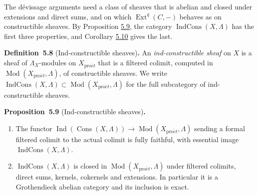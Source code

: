 \documentclass[11pt]{article}
\newenvironment{bpstatement}[2]{\par\addvspace{0.6\baselineskip}\noindent\textbf{#1}#2\textbf{.}\enspace\ignorespaces}
  {\par\addvspace{0.4\baselineskip}}
\newenvironment{bpstatementit}[2]{\begin{bpstatement}{#1}{#2}\itshape\ignorespaces}{\end{bpstatement}}
\providecommand{\Cons}{}\renewcommand{\Cons}{\operatorname{Cons}}
\providecommand{\Ext}{}\renewcommand{\Ext}{\operatorname{Ext}}
\providecommand{\IndCons}{}\renewcommand{\IndCons}{\operatorname{IndCons}}
\begin{document}
The dévissage arguments need a class of sheaves that is abelian and closed under extensions and direct sums, and on which \(\Ext^q(C,-)\) behaves as on constructible sheaves. By Proposition \hyperref[bp433]{5.9}, the category \(\IndCons(X,\Lambda)\) has the first three properties, and Corollary \hyperref[bp436]{5.10} gives the last.

\label{bp432}%
\begin{bpstatement}{Definition~5.8}{ (Ind-constructible sheaves)}
An \emph{ind-constructible sheaf} on \(X\) is a sheaf of \(\Lambda_X\)-modules on \(X_{\mathrm{pro}\acute{e}t}\) that is a filtered colimit, computed in \(\operatorname{Mod}(X_{\mathrm{pro}\acute{e}t},\Lambda)\), of constructible sheaves. We write \(\IndCons(X,\Lambda)\subset\operatorname{Mod}(X_{\mathrm{pro}\acute{e}t},\Lambda)\) for the full subcategory of ind-constructible sheaves.
\end{bpstatement}

\label{bp433}%
\begin{bpstatementit}{Proposition~5.9}{ (Ind-constructible sheaves)}
\begin{enumerate}
\item The functor \(\operatorname{Ind}(\Cons(X,\Lambda))\to\operatorname{Mod}(X_{\mathrm{pro}\acute{e}t},\Lambda)\) sending a formal filtered colimit to the actual colimit is fully faithful, with essential image \(\IndCons(X,\Lambda)\).
\item \(\IndCons(X,\Lambda)\) is closed in \(\operatorname{Mod}(X_{\mathrm{pro}\acute{e}t},\Lambda)\) under filtered colimits, direct sums, kernels, cokernels and extensions. In particular it is a Grothendieck abelian category and its inclusion is exact.
\end{enumerate}
\end{bpstatementit}
\end{document}
